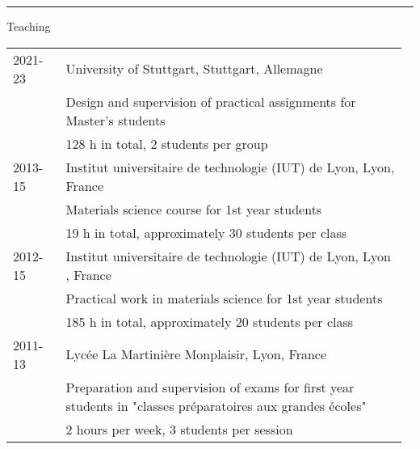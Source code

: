 \documentclass[a4paper,11pt]{concours}
\begin{document}
\vspace{1.4cm}

\noindent\begin{minipage}{0.147\linewidth}
{\color{gray120}\rule{\textwidth}{0.22cm}\relax}
\end{minipage}
\begin{minipage}{0.82\linewidth}
{\textcolor{gray120}{\huge Teaching}}
\end{minipage}

\begin{table}[htbp]
\begin{tabular}{@{} p{0.13\linewidth} p{0.84\linewidth} @{}}
\vspace{-0.3cm}
2021-23 & University of Stuttgart, Stuttgart, Allemagne \\
& Design and supervision of practical assignments for Master's students\\
& 128 h in total, 2 students per group \\
\hline \hline
2013-15 & Institut universitaire de technologie (IUT) de Lyon, Lyon, France \\
& Materials science course for 1st year students \\
& 19 h in total, approximately 30 students per class \\
\hline \hline
2012-15 & Institut universitaire de technologie (IUT) de Lyon, Lyon , France \\
& Practical work in materials science for 1st year students \\ 
& 185 h in total, approximately 20 students per class \\
\hline \hline
2011-13 & Lycée La Martinière Monplaisir, Lyon, France \\
& Preparation and supervision of exams for first year students in "classes préparatoires
aux grandes écoles" \\
& 2 hours per week, 3 students per session \\
\end{tabular}
\end{table}


\newpage
\end{document}
